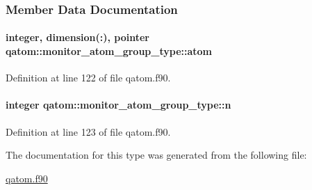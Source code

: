 \subsubsection{Member Data Documentation}
\hypertarget{structqatom_1_1monitor__atom__group__type_a755872019451f3bc41f637aca5737b57}{
\paragraph[{atom}]{\setlength{\rightskip}{0pt plus 5cm}integer, dimension(\-:), pointer qatom\-::monitor\-\_\-atom\-\_\-group\-\_\-type\-::atom}}\label{structqatom_1_1monitor__atom__group__type_a755872019451f3bc41f637aca5737b57}


Definition at line 122 of file qatom.\-f90.

\hypertarget{structqatom_1_1monitor__atom__group__type_a8b8da0061a3a668546661669f124251c}{
\paragraph[{n}]{\setlength{\rightskip}{0pt plus 5cm}integer qatom\-::monitor\-\_\-atom\-\_\-group\-\_\-type\-::n}}\label{structqatom_1_1monitor__atom__group__type_a8b8da0061a3a668546661669f124251c}


Definition at line 123 of file qatom.\-f90.



The documentation for this type was generated from the following file\-:\begin{DoxyCompactItemize}
\item 
\hyperlink{qatom_8f90}{qatom.\-f90}\end{DoxyCompactItemize}
